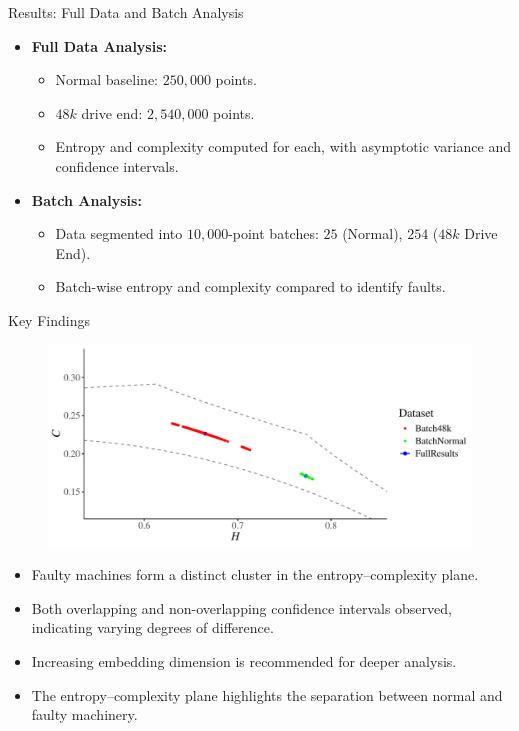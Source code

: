 \documentclass{beamer}
\begin{document}
\begin{frame}{Results: Full Data and Batch Analysis}
	\begin{itemize}
		\item \textbf{Full Data Analysis:}
		\begin{itemize}
			\item Normal baseline: $250,\!000$ points.
			\item $48k$ drive end: $2,\!540,\!000$ points.
			\item Entropy and complexity computed for each, with asymptotic variance and confidence intervals.
		\end{itemize}
		\item \textbf{Batch Analysis:}
		\begin{itemize}
			\item Data segmented into $10,\!000$-point batches: $25$ (Normal), $254$ ($48k$ Drive End).
			\item Batch-wise entropy and complexity compared to identify faults.
		\end{itemize}
	\end{itemize}
\end{frame}

\begin{frame}{Key Findings}
	\begin{figure}[hbt]
	\centering
	\includegraphics[width=0.6 \textwidth]{confidence_interval}
	\label{fig:EntopyComplexity Plane}
\end{figure}
	\begin{itemize}
		\item Faulty machines form a distinct cluster in the entropy–complexity plane.
		\item Both overlapping and non-overlapping confidence intervals observed, indicating varying degrees of difference.
		\item Increasing embedding dimension is recommended for deeper analysis.
		\item The entropy–complexity plane highlights the separation between normal and faulty machinery.
	\end{itemize}
\end{frame}
\end{document}
